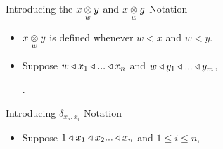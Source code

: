
\newcommand{\inningsCrossSide}{\crossx{innings\kern-0.3cm}{\kern-0.3cm side}{match}}
\newcommand{\inningsCrossPlayer}{\crossx{innings\kern-0.3cm}{\kern-0.3cm player}{match}}
\newcommand{\fieldingSidePlayer}{fieldingSide ^* (\inningsCrossPlayer)}
\newcommand{\battingSidePlayer}{battingSide ^* (\inningsCrossPlayer)}
\newcommand{\overCrossFieldingSidePlayer}{\crossx{over\kern-0.4cm}{\kern-0.4cm(\fieldingSidePlayer)}{innings}}
\newcommand{\deliveryCrossBattingSidePlayer}{\crossx{delivery\kern-0.4cm}{\kern-0.4cm (\battingSidePlayer)}{innings}}

\begin{frame}{Introducing the $\crossx{x}{y}{w}$ and $\crossx{x}{g}{w}$ Notation}
\pause
\begin{itemize}
\item $\crossx{x}{y}{w}$ is defined whenever $w < x$ and $w<y$.
\pause
\item Suppose $w \base x_1 \base ... \base x_n $
and $w \base y_1 \base ... \base y_m$, 
\begin{center}

\end{center}
.
\end{itemize}
\end{frame}

\begin{frame}{Introducing $\delta_{x_n,x_i}$ Notation}
\begin{itemize}
\item Suppose $1 \base x_1 \base x_2 ... \base x_n$ and $1 \leq i \leq n$,
\begin{center}

\end{center}
\end{itemize}
\end{frame}

